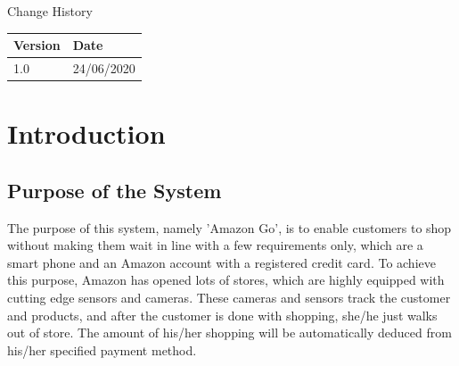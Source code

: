 \documentclass[11pt]{article}
\begin{document}


\newpage

\begin{center}
    \Huge{Change History} 
\end{center}{}
 


\begin{table}[H]
\begin{center}
    

\begin{tabular}{|l|l|}
\hline
\textbf{\Huge{Version}} & \textbf{\Huge{Date}}  \\ \hline
 1.0 & 24/06/2020 \\ \hline
\end{tabular}
\end{center}
\end{table}

\newpage



\begin{flushleft}
    \tableofcontents
\end{flushleft}

\newpage

\begin{flushleft}
    \listoffigures
\end{flushleft}

\newpage

\begin{flushleft}
    \listoftables
\end{flushleft}

\newpage


\section{Introduction}

    \subsection{Purpose of the System}

    The purpose of this system, namely 'Amazon Go', is to enable customers to shop without making them wait in line with a few
    requirements only, which are a smart phone and an Amazon account with a registered credit card. To achieve this purpose, Amazon has opened lots of stores, 
    which are highly equipped with cutting edge sensors and cameras. These cameras and sensors track the customer and products,
    and after the customer is done with shopping, she/he just walks out of store. The amount of his/her shopping will be automatically 
    deduced from his/her specified payment method.
        
\end{document}
